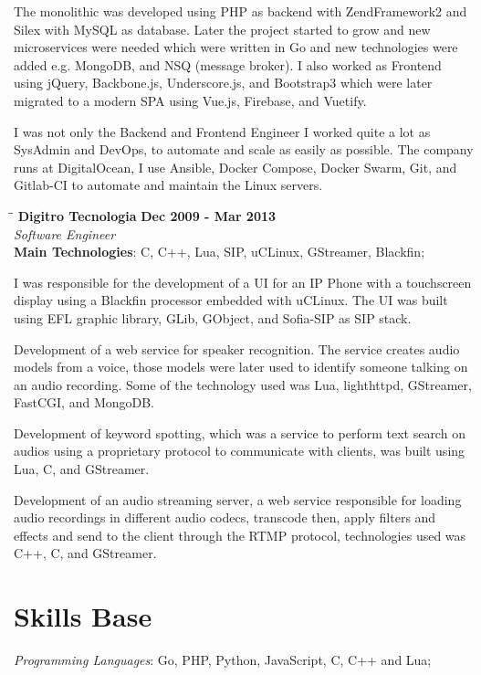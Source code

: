 \documentclass[margin]{res}
\begin{document}
\begin{resume}
The monolithic was developed using PHP as backend with ZendFramework2 and Silex with MySQL as database. Later the project started to grow and new microservices were needed which were written in Go and new technologies were added e.g. MongoDB, and NSQ (message broker). I also worked as Frontend using jQuery, Backbone.js, Underscore.js, and Bootstrap3 which were later migrated to a modern SPA using Vue.js, Firebase, and Vuetify.

I was not only the Backend and Frontend Engineer I worked quite a lot as SysAdmin and DevOps, to automate and scale as easily as possible. The company runs at DigitalOcean, I use Ansible, Docker Compose, Docker Swarm, Git, and Gitlab-CI to automate and maintain the Linux servers.

\vspace{-0.1in}
    \begin{tabbing}
    \hspace{2.3in}\= \hspace{1.7in}\= \kill
    \textbf{Digitro Tecnologia}    \>\>\textbf{Dec 2009 - Mar 2013}\\
    \textit{Software Engineer}\\
    \textbf{Main Technologies}: C, C++, Lua, SIP, uCLinux, GStreamer, Blackfin;
    \end{tabbing}\vspace{-20pt}
    \vspace{2mm}
I was responsible for the development of a UI for an IP Phone with a touchscreen display using a Blackfin processor embedded with uCLinux. The UI was built using EFL graphic library, GLib, GObject, and Sofia-SIP as SIP stack.

Development of a web service for speaker recognition. The service creates audio models from a voice, those models were later used to identify someone talking on an audio recording. Some of the technology used was Lua, lighthttpd, GStreamer, FastCGI, and MongoDB.

Development of keyword spotting, which was a service to perform text search on audios using a proprietary protocol to communicate with clients, was built using Lua, C, and GStreamer.

Development of an audio streaming server, a web service responsible for loading audio recordings in different audio codecs, transcode then, apply filters and effects and send to the client through the RTMP protocol, technologies used was C++, C, and GStreamer.

\section{Skills Base}
	\textit{Programming Languages}: Go, PHP, Python, JavaScript, C, C++ and Lua;


\end{resume}
\end{document}
